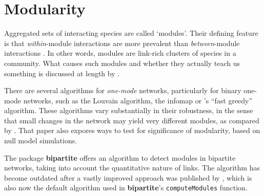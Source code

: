 \documentclass[a4paper, 11pt]{article}\usepackage[]{graphicx}\usepackage[dvipsnames]{xcolor}
\newcommand{\package}[1]{\textbf{#1}}
\newcommand{\code}[1]{\texttt{#1}}
\begin{document}
\section{Modularity}
Aggregated sets of interacting species are called `modules'. Their defining feature is that \emph{within}-module interactions are more prevalent than \emph{between}-module interactions \citep{Newman2003, Newman2004, Fortunato2010}. In other words, modules are link-rich clusters of species in a community. What causes such modules and whether they actually teach us something is discussed at length by \citet{Dormann2017AREES}. 

There are several algorithms for \emph{one-mode} networks, particularly for binary one-mode networks, such as the Louvain algorithm, the infomap or \citet{Clauset2004}'s ``fast greedy'' algorithm. These algorithms vary substantially in their robustness, in the sense that small changes in the network may yield very different modules, as compared by \citet{Policastro2021}. That paper also expores ways to test for significance of modularity, based on null model simulations.

The package \package{bipartite} offers an algorithm \citep[QuaBiMo, described in technical detail in][]{Dormann2014} to detect modules in bipartite networks, taking into account the quantitative nature of links. The algorithm has become outdated after a vastly improved approach was published by \citet{Beckett2016}, which is also now the default algorithm used in \package{bipartite}'s \code{computeModules} function.
\end{document}
